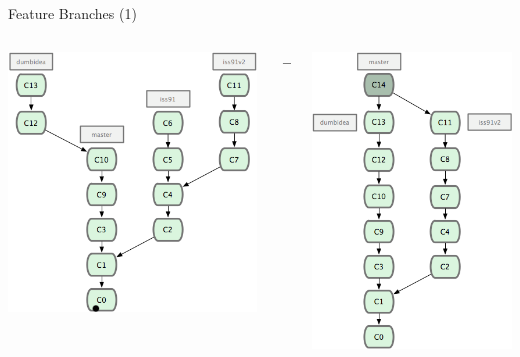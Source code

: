 \begin{frame}{Feature Branches (1)}
\begin{columns}[T]
  \begin{column}{.45\textwidth}
    \begin{block}{}
      \includegraphics[scale=0.6]{images/feature-branches1.png}
    \end{block}
  \end{column}
  \begin{column}{.1\textwidth}
    \begin{block}{}
      \pause $\longrightarrow$
    \end{block}
  \end{column}
  \begin{column}{.45\textwidth}
    \begin{block}{}  
        \pause \includegraphics[scale=0.6]{images/feature-branches2.png}

\end{block}
\end{column}
\end{columns}
\end{frame}

